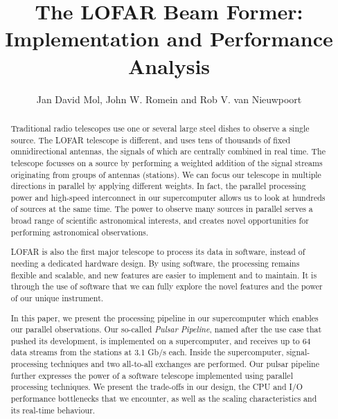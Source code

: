 \documentclass{llncs}
\begin{document}
\newcommand{\comment}[1]{}

\author{Jan David Mol, John W. Romein and Rob V. van Nieuwpoort}
\title{The LOFAR Beam Former: \\ Implementation and Performance Analysis}
\maketitle


\begin{abstract}
Traditional radio telescopes use one or several large steel dishes to observe a single source. The LOFAR telescope is different, and uses tens of thousands of fixed omnidirectional antennas, the signals of which are centrally combined in real time. The telescope focusses on a source by performing a weighted addition of the signal streams originating from groups of antennas (stations). We can focus our telescope in multiple directions in parallel by applying different weights. In fact, the parallel processing power and high-speed interconnect in our supercomputer allows us to look at hundreds of sources at the same time. The power to observe many sources in parallel serves a broad range of scientific astronomical interests, and creates novel opportunities for performing astronomical observations.

LOFAR is also the first major telescope to process its data in software, instead of needing a dedicated hardware design. By using software, the processing remains flexible and scalable, and new features are easier to implement and to maintain. It is through the use of software that we can fully explore the novel features and the power of our unique instrument.

In this paper, we present the processing pipeline in our supercomputer which enables our parallel observations. Our so-called \emph{Pulsar Pipeline}, named after the use case that pushed its development, is implemented on a supercomputer, and receives up to 64 data streams from the stations at 3.1 Gb/s each. Inside the supercomputer, signal-processing techniques and two all-to-all exchanges are performed. Our pulsar pipeline further expresses the power of a software telescope implemented using parallel processing techniques. We present the trade-offs in our design, the CPU and I/O performance bottlenecks that we encounter, as well as the scaling characteristics and its real-time behaviour. 
      
\comment{
  
}
\end{abstract}
\end{document}
